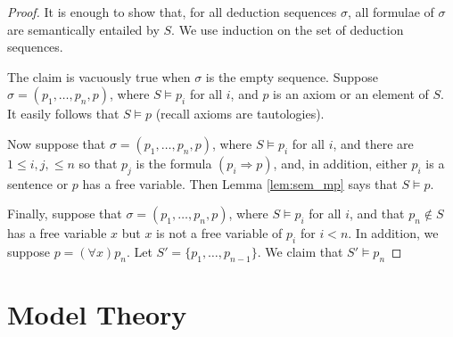 \documentclass{report}
\theoremstyle{definition}
\theoremstyle{plain}
\theoremstyle{definition}
\begin{document}
	\begin{proof}
		It is enough to show that, for all deduction sequences $\sigma$, all formulae of $\sigma$ are semantically entailed by $S$. We use induction on the set of deduction sequences.
		
		The claim is vacuously true when $\sigma$ is the empty sequence. Suppose $\sigma = (p_1,\ldots, p_n,p)$, where $S\models p_i$ for all $i$, and $p$ is an axiom or an element of $S$. It easily follows that $S\models p$ (recall axioms are tautologies).
		
		Now suppose that $\sigma = (p_1,\ldots,p_n,p)$, where $S\models p_i$ for all $i$, and there are $1\leq i,j, \leq n$ so that $p_j$ is the formula $(p_i \Rightarrow p)$, and, in addition, either $p_i$ is a sentence or $p$ has a free variable. Then Lemma \ref{lem:sem_mp} says that $S\models p$.
		
		Finally, suppose that $\sigma = (p_1,\ldots,p_n,p)$, where $S\models p_i$ for all $i$, and that $p_n\notin S$ has a free variable $x$ but $x$ is not a free variable of $p_i$ for $i<n$. In addition, we suppose $p = (\forall x)p_n$. Let $S' = \{p_1,\ldots, p_{n-1}\}$. We claim that $S'\models p_n$	
	\end{proof}
	\chapter{Model Theory}
\end{document}
